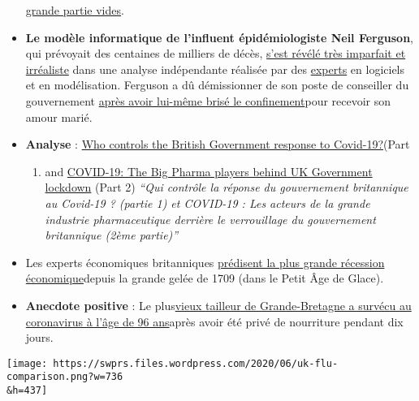 \begin{itemize}
  \href{https://www.telegraph.co.uk/news/0/do-many-nhs-nightingale-hospitals-remain-empty/}{grande
  partie vides}.
\item
  \textbf{Le modèle informatique de l'influent épidémiologiste Neil
  Ferguson}, qui prévoyait des centaines de milliers de décès,
  \href{https://www.telegraph.co.uk/technology/2020/05/16/neil-fergusons-imperial-model-could-devastating-software-mistake/}{s'est
  révélé très imparfait et irréaliste} dans une analyse indépendante
  réalisée par des
  \href{https://www.telegraph.co.uk/technology/2020/05/16/neil-fergusons-imperial-model-could-devastating-software-mistake/}{experts}
  en logiciels et en modélisation. Ferguson a dû démissionner de son
  poste de conseiller du gouvernement
  \href{https://www.telegraph.co.uk/news/2020/05/05/exclusive-government-scientist-neil-ferguson-resigns-breaking/}{après
  avoir lui-même brisé le confinement}pour recevoir son amour marié.
\item
  \textbf{Analyse} :
  \href{https://www.ukcolumn.org/article/who-controls-british-government-response-covid19-part-one}{Who
  controls the British Government response to Covid-19?}(Part

  \begin{enumerate}
  \def\labelenumi{\arabic{enumi})}
  \tightlist
  \item
    and
    \href{https://www.ukcolumn.org/article/covid\%25E2\%2580\%259319-big-pharma-players-behind-uk-government-lockdown}{COVID-19:
    The Big Pharma players behind UK Government lockdown} (Part 2)
    \emph{``Qui contrôle la réponse du gouvernement britannique au
    Covid-19 ? (partie 1) et COVID-19 : Les acteurs de la grande
    industrie pharmaceutique derrière le verrouillage du gouvernement
    britannique (2ème partie)''}
  \end{enumerate}
\item
  Les experts économiques britanniques
  \href{https://twitter.com/FinancialTimes/status/1258499372251328515}{prédisent
  la plus grande récession économique}depuis la grande gelée de 1709
  (dans le Petit Âge de Glace).
\item
  \textbf{Anecdote positive} : Le
  plus\href{https://www.yorkpress.co.uk/news/18449261.oldest-working-tailor-uk-elwyn-96-beats-coronavirus/}{vieux
  tailleur de Grande-Bretagne a survécu au coronavirus à l'âge de 96
  ans}après avoir été privé de nourriture pendant dix jours.
\end{itemize}

\texttt{[image: https://swprs.files.wordpress.com/2020/06/uk-flu-comparison.png?w=736\\\&h=437]}

